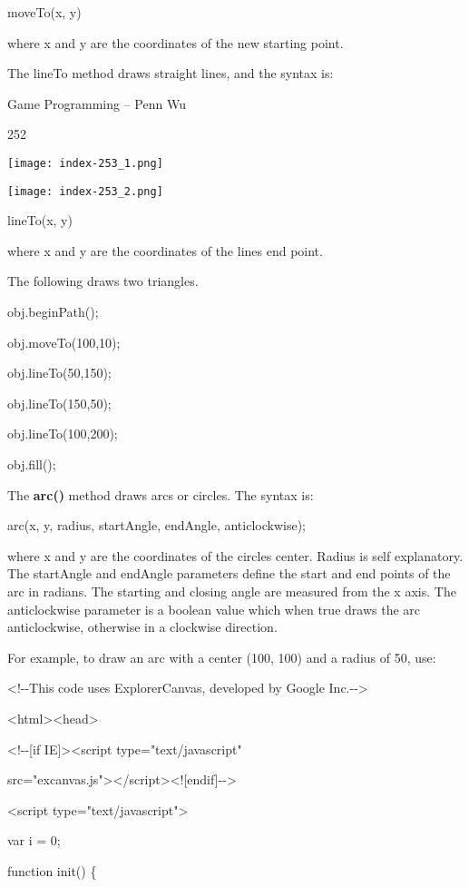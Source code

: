 \documentclass[
]{article}
\begin{document}
moveTo(x, y)

where x and y are the coordinates of the new starting point.

The lineTo method draws straight lines, and the syntax is:

Game Programming -- Penn Wu

252

\protect\hypertarget{index_split_013.htmlux5cux23p253}{}{}\texttt{[image: index-253\_1.png]}

\texttt{[image: index-253\_2.png]}

lineTo(x, y)

where x and y are the coordinates of the line\textquotesingle s end
point.

The following draws two triangles.

obj.beginPath();

obj.moveTo(100,10);

obj.lineTo(50,150);

obj.lineTo(150,50);

obj.lineTo(100,200);

obj.fill();

The \textbf{arc()} method draws arcs or circles. The syntax is:

arc(x, y, radius, startAngle, endAngle, anticlockwise);

where x and y are the coordinates of the circle\textquotesingle s
center. Radius is self explanatory. The startAngle and endAngle
parameters define the start and end points of the arc in radians. The
starting and closing angle are measured from the x axis. The
anticlockwise parameter is a boolean value which when true draws the arc
anticlockwise, otherwise in a clockwise direction.

For example, to draw an arc with a center (100, 100) and a radius of 50,
use:

\textless!-\/-This code uses ExplorerCanvas, developed by Google
Inc.-\/-\textgreater{}

\textless html\textgreater\textless head\textgreater{}

\textless!-\/-{[}if IE{]}\textgreater\textless script
type="text/javascript"

src="excanvas.js"\textgreater\textless/script\textgreater\textless!{[}endif{]}-\/-\textgreater{}

\textless script type="text/javascript"\textgreater{}

var i = 0;

function init() \{
\end{document}
